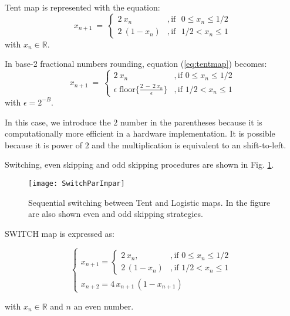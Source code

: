 Tent map is represented with the equation:
\begin{equation}\label{eq:tentmap}
x_{n+1}~=~ \left\{ \begin{array}{ll}
2~{x_n} &, \textrm{if ~$0\leq x_n\leq 1/2$}\\
2~(1-{x_n}) &, \textrm{if ~$1/2<x_n\leq 1$} 
\end{array} \right. 
\end{equation}
with $x_n \in \mathbb{R}$.

In base-2 fractional numbers rounding, equation (\ref{eq:tentmap}) becomes:
\begin{equation}\label{eq:tentdecbin}
x_{n+1}~=~ \left\{ \begin{array}{ll}
2~{x_n} &, \textrm{if $0\leq x_n\leq 1/2$}\\
\epsilon \; \text{floor}\{\frac{2~-~2~x_n}{\epsilon}\} &, \textrm{if $1/2<x_n\leq 1$} 
\end{array} \right. 
\end{equation}
with $\epsilon=2^{-B}$.

In this case, we introduce the $2$ number in the parentheses because it is computationally more efficient in a hardware implementation.
It is possible because it is power of $2$ and the multiplication is equivalent to an shift-to-left.

Switching, even skipping and odd skipping procedures are shown in Fig. \ref{fig:seq}.

\begin{figure}[htpb]
\centering	
	\texttt{[image: SwitchParImpar]}
	\caption{Sequential switching between Tent and Logistic maps. In the figure are also shown even and odd skipping strategies.} \label{fig:seq}
\end{figure}

SWITCH map is expressed as:

\begin{equation}
\begin{cases}
x_{n+1}=
\begin{cases}
2\,x_n, &, \mbox{if } 0\leq x_n\leq 1/2 \\
2\,(1-x_n ) &, \mbox{if } 1/2<x_n\leq 1
\end{cases} \\
x_{n+2}=4\,x_{n+1}\,(1-x_{n+1})
\end{cases}\label{eq:SWITCH}
\end{equation}

\noindent with $x_n \in \mathbb{R}$ and $n$ an even number.


